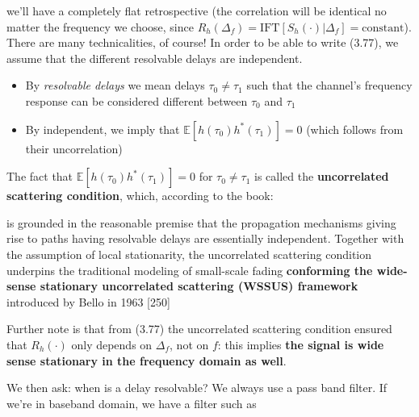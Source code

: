 \documentclass[a4paper, 12pt]{book}
\begin{document}
we'll have a completely flat retrospective (the correlation will be identical no matter the frequency we choose, since $R_h(\Delta_f) = \text{IFT}[S_h(\cdot)|\Delta_f] = \text{constant}$).
There are many technicalities, of course! In order to be able to write (3.77), we assume that the different resolvable delays are independent.

\begin{bluebox}
\begin{itemize}
    \item By \textit{resolvable delays} we mean delays $\tau_0 \neq \tau_1$ such that the channel's frequency response can be considered different between $\tau_0$ and $\tau_1$
    \item By independent, we imply that $\mathbb{E}[h(\tau_0)h^*(\tau_1)] = 0$ (which follows from their {\color{green!60!black} uncorrelation})
\end{itemize}
\end{bluebox}

The fact that $\mathbb{E}[h(\tau_0)h^*(\tau_1)] = 0$ for $\tau_0 \neq \tau_1$ is called the \textbf{uncorrelated scattering condition}, which, according to the book:

\begin{yellowbox}
is grounded in the reasonable premise that the propagation mechanisms giving rise to paths having resolvable delays are essentially independent. Together with the assumption of local stationarity, the uncorrelated scattering condition underpins the traditional modeling of small-scale fading \textbf{conforming the wide-sense stationary uncorrelated scattering (WSSUS) framework} introduced by Bello in 1963 [250]
\end{yellowbox}

Further note is that from (3.77) the uncorrelated scattering condition ensured that $R_h(\cdot)$ only depends on $\Delta_f$, not on $f$: this implies \textbf{the signal is wide sense stationary in the frequency domain as well}.

We then ask: when is a delay resolvable? We always use a pass band filter. If we're in baseband domain, we have a filter such as
\end{document}
